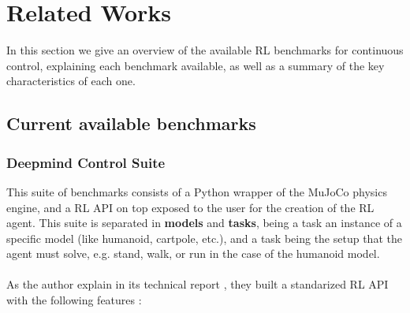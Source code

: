 
\chapter{Related Works}
\label{ch:relatedWorks}

In this section we give an overview of the available RL benchmarks for continuous 
control, explaining each benchmark available, as well as a summary of the key characteristics
 of each one.

\section{Current available benchmarks}

    \subsection{Deepmind Control Suite}
    This suite of benchmarks consists of a Python wrapper of the MuJoCo physics engine, and a RL API on top
    exposed to the user for the creation of the RL agent. This suite is separated in \textbf{models} and \textbf{tasks},
    being a task an instance of a specific model (like humanoid, cartpole, etc.), and a task being the setup that
    the agent must solve, e.g. stand, walk, or run in the case of the humanoid model.
    \\
    \\
    As the author explain in its technical report \citep{Controlsuite}, they built a standarized RL API with 
    the following features :

